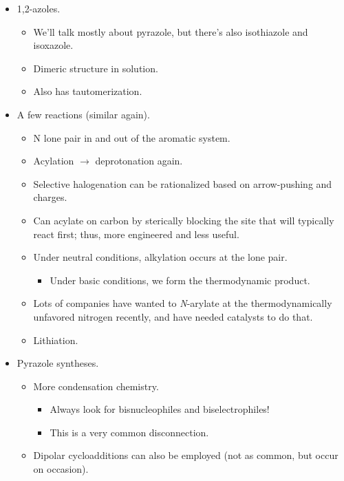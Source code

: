 \documentclass[../notes.tex]{subfiles}
\begin{document}
\begin{itemize}
\begin{itemize}
\begin{itemize}
        \end{itemize}
    \end{itemize}
    \item 1,2-azoles.
    \begin{itemize}
        \item We'll talk mostly about pyrazole, but there's also isothiazole and isoxazole.
        \item Dimeric structure in solution.
        \item Also has tautomerization.
    \end{itemize}
    \item A few reactions (similar again).
    \begin{itemize}
        \item N lone pair in and out of the aromatic system.
        \item Acylation $\to$ deprotonation again.
        \item Selective halogenation can be rationalized based on arrow-pushing and charges.
        \item Can acylate on carbon by sterically blocking the site that will typically react first; thus, more engineered and less useful.
        \item Under neutral conditions, alkylation occurs at the lone pair.
        \begin{itemize}
            \item Under basic conditions, we form the thermodynamic product.
        \end{itemize}
        \item Lots of companies have wanted to \emph{N}-arylate at the thermodynamically unfavored nitrogen recently, and have needed catalysts to do that.
        \item Lithiation.
    \end{itemize}
    \item Pyrazole syntheses.
    \begin{itemize}
        \item More condensation chemistry.
        \begin{itemize}
            \item Always look for bisnucleophiles and biselectrophiles!
            \item This is a very common disconnection.
        \end{itemize}
        \item Dipolar cycloadditions can also be employed (not as common, but occur on occasion).

\end{itemize}
\end{itemize}
\end{document}
